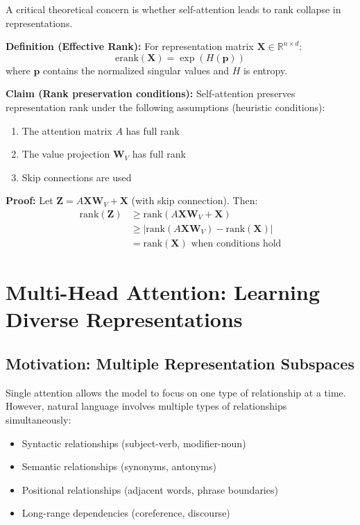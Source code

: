 \documentclass[11pt]{article}
\begin{document}
A critical theoretical concern is whether self-attention leads to rank collapse in representations.

\textbf{Definition (Effective Rank):} For representation matrix $\mathbf{X} \in \mathbb{R}^{n \times d}$:
\begin{equation}
\text{erank}(\mathbf{X}) = \exp\left(H(\mathbf{p})\right)
\end{equation}
where $\mathbf{p}$ contains the normalized singular values and $H$ is entropy.

\textbf{Claim (Rank preservation conditions):} Self-attention preserves representation rank under the following assumptions (heuristic conditions):
\begin{enumerate}
    \item The attention matrix $A$ has full rank
    \item The value projection $\mathbf{W}_V$ has full rank
    \item Skip connections are used
\end{enumerate}

\textbf{Proof:} Let $\mathbf{Z} = A\mathbf{X}\mathbf{W}_V + \mathbf{X}$ (with skip connection). Then:
\begin{align}
\text{rank}(\mathbf{Z}) &\geq \text{rank}(A\mathbf{X}\mathbf{W}_V + \mathbf{X}) \\
&\geq |\text{rank}(A\mathbf{X}\mathbf{W}_V) - \text{rank}(\mathbf{X})| \\
&= \text{rank}(\mathbf{X}) \text{ when conditions hold}
\end{align}

\section{Multi-Head Attention: Learning Diverse Representations}

\subsection{Motivation: Multiple Representation Subspaces}

Single attention allows the model to focus on one type of relationship at a time. However, natural language involves multiple types of relationships simultaneously:
\begin{itemize}
    \item Syntactic relationships (subject-verb, modifier-noun)
    \item Semantic relationships (synonyms, antonyms)
    \item Positional relationships (adjacent words, phrase boundaries)
    \item Long-range dependencies (coreference, discourse)
\end{itemize}
\end{document}
